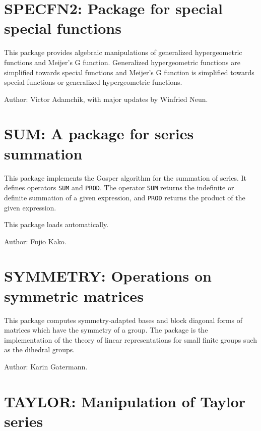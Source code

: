 \section{SPECFN2: Package for special special functions} 


This package provides algebraic manipulations of generalized
hypergeometric functions and Meijer's G function.  Generalized
hypergeometric functions are simplified towards special functions and
Meijer's G function is simplified towards special functions or generalized
hypergeometric functions.

Author: Victor Adamchik, with major updates by Winfried Neun.



\section{SUM: A package for series summation} 
\hypertarget{operator:SUM}{}
\hypertarget{operator:PROD}{}

This package implements the Gosper algorithm for the summation of series.
It defines operators {\tt SUM} and {\tt PROD}.  The operator {\tt SUM}
returns the indefinite or definite summation of a given expression, and
{\tt PROD} returns the product of the given expression.

This package loads automatically.

Author: Fujio Kako.

\section{SYMMETRY: Operations on symmetric matrices} 

This package computes symmetry-adapted bases and block diagonal forms of
matrices which have the symmetry of a group.  The package is the
implementation of the theory of linear representations for small finite
groups such as the dihedral groups.

Author: Karin Gatermann.

\section{TAYLOR: Manipulation of Taylor series}
 
 

